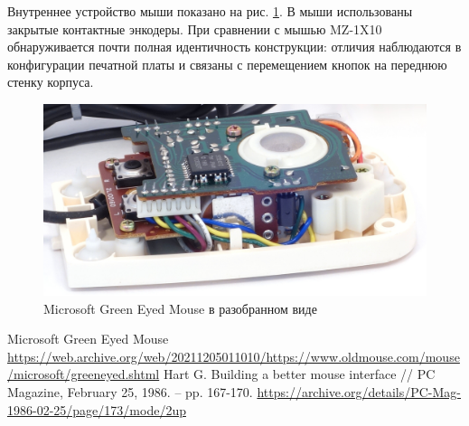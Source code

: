 \documentclass[11pt, a4paper]{article}
\begin{document}
Внутреннее устройство мыши показано на рис. \ref{fig:MicrosoftGreenEyedInside}. В мыши использованы закрытые контактные энкодеры. При сравнении с мышью MZ-1X10 обнаруживается почти полная идентичность конструкции: отличия наблюдаются в конфигурации печатной платы и связаны с перемещением кнопок на переднюю стенку корпуса.

 \begin{figure}[h]
    \centering
    \includegraphics[scale=1]{1983_microsoft_green_eyed_mouse/inside_30.jpg}
    \caption{Microsoft Green Eyed Mouse в разобранном виде}
    \label{fig:MicrosoftGreenEyedInside}
\end{figure}



\begin{thebibliography}{9}
 Microsoft Green Eyed Mouse \url{https://web.archive.org/web/20211205011010/https://www.oldmouse.com/mouse/microsoft/greeneyed.shtml}
 Hart G. Building a better mouse interface // PC Magazine, February 25, 1986. -- pp. 167-170. \url{https://archive.org/details/PC-Mag-1986-02-25/page/173/mode/2up}
\end{thebibliography}
\end{document}

